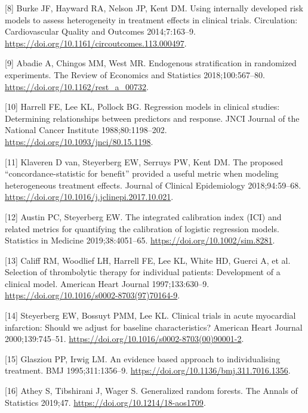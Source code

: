 \documentclass[]{elsarticle} %
\newenvironment{cslreferences}%
  {}%
  {\par}
\begin{document}
\begin{cslreferences}
\leavevmode\hypertarget{ref-Burke2014}{}%
{[}8{]} Burke JF, Hayward RA, Nelson JP, Kent DM. Using internally
developed risk models to assess heterogeneity in treatment effects in
clinical trials. Circulation: Cardiovascular Quality and Outcomes
2014;7:163--9. \url{https://doi.org/10.1161/circoutcomes.113.000497}.

\leavevmode\hypertarget{ref-Abadie2018}{}%
{[}9{]} Abadie A, Chingos MM, West MR. Endogenous stratification in
randomized experiments. The Review of Economics and Statistics
2018;100:567--80. \url{https://doi.org/10.1162/rest_a_00732}.

\leavevmode\hypertarget{ref-Harrell1988}{}%
{[}10{]} Harrell FE, Lee KL, Pollock BG. Regression models in clinical
studies: Determining relationships between predictors and response. JNCI
Journal of the National Cancer Institute 1988;80:1198--202.
\url{https://doi.org/10.1093/jnci/80.15.1198}.

\leavevmode\hypertarget{ref-vanKlaveren2018}{}%
{[}11{]} Klaveren D van, Steyerberg EW, Serruys PW, Kent DM. The
proposed ``concordance-statistic for benefit'' provided a useful metric
when modeling heterogeneous treatment effects. Journal of Clinical
Epidemiology 2018;94:59--68.
\url{https://doi.org/10.1016/j.jclinepi.2017.10.021}.

\leavevmode\hypertarget{ref-Austin2019}{}%
{[}12{]} Austin PC, Steyerberg EW. The integrated calibration index
(ICI) and related metrics for quantifying the calibration of logistic
regression models. Statistics in Medicine 2019;38:4051--65.
\url{https://doi.org/10.1002/sim.8281}.

\leavevmode\hypertarget{ref-Califf1997}{}%
{[}13{]} Califf RM, Woodlief LH, Harrell FE, Lee KL, White HD, Guerci A,
et al. Selection of thrombolytic therapy for individual patients:
Development of a clinical model. American Heart Journal 1997;133:630--9.
\url{https://doi.org/10.1016/s0002-8703(97)70164-9}.

\leavevmode\hypertarget{ref-Steyerberg2000}{}%
{[}14{]} Steyerberg EW, Bossuyt PMM, Lee KL. Clinical trials in acute
myocardial infarction: Should we adjust for baseline characteristics?
American Heart Journal 2000;139:745--51.
\url{https://doi.org/10.1016/s0002-8703(00)90001-2}.

\leavevmode\hypertarget{ref-Glasziou1995}{}%
{[}15{]} Glasziou PP, Irwig LM. An evidence based approach to
individualising treatment. BMJ 1995;311:1356--9.
\url{https://doi.org/10.1136/bmj.311.7016.1356}.

\leavevmode\hypertarget{ref-Athey2019}{}%
{[}16{]} Athey S, Tibshirani J, Wager S. Generalized random forests. The
Annals of Statistics 2019;47. \url{https://doi.org/10.1214/18-aos1709}.


\end{cslreferences}
\end{document}
